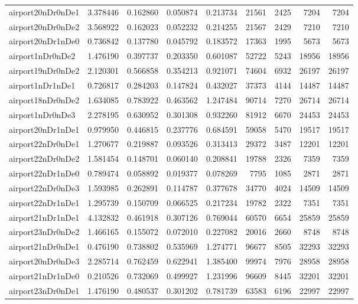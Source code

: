 \begin{longtable}{|l|r|r|r|r|r|r|r|r|}
airport20nDr0nDe1 & 3.378446 & 0.162860 & 0.050874 & 0.213734 & 21561 & 2425 & 7204 & 7204 \\
airport20nDr0nDe2 & 3.568922 & 0.162023 & 0.052232 & 0.214255 & 21567 & 2429 & 7210 & 7210 \\
airport20nDr1nDe0 & 0.736842 & 0.137780 & 0.045792 & 0.183572 & 17363 & 1995 & 5673 & 5673 \\
airport1nDr0nDe2 & 1.476190 & 0.397737 & 0.203350 & 0.601087 & 52722 & 5243 & 18956 & 18956 \\
airport19nDr0nDe2 & 2.120301 & 0.566858 & 0.354213 & 0.921071 & 74604 & 6932 & 26197 & 26197 \\
airport1nDr1nDe1 & 0.726817 & 0.284203 & 0.147824 & 0.432027 & 37373 & 4144 & 14487 & 14487 \\
airport18nDr0nDe2 & 1.634085 & 0.783922 & 0.463562 & 1.247484 & 90714 & 7270 & 26714 & 26714 \\
airport1nDr0nDe3 & 2.278195 & 0.630952 & 0.301308 & 0.932260 & 81912 & 6670 & 24453 & 24453 \\
airport20nDr1nDe1 & 0.979950 & 0.446815 & 0.237776 & 0.684591 & 59058 & 5470 & 19517 & 19517 \\
airport22nDr0nDe1 & 1.270677 & 0.219887 & 0.093526 & 0.313413 & 29372 & 3487 & 12201 & 12201 \\
airport22nDr0nDe2 & 1.581454 & 0.148701 & 0.060140 & 0.208841 & 19788 & 2326 & 7359 & 7359 \\
airport22nDr1nDe0 & 0.789474 & 0.058892 & 0.019377 & 0.078269 & 7795 & 1085 & 2871 & 2871 \\
airport22nDr0nDe3 & 1.593985 & 0.262891 & 0.114787 & 0.377678 & 34770 & 4024 & 14509 & 14509 \\
airport22nDr1nDe1 & 1.295739 & 0.150709 & 0.066525 & 0.217234 & 19782 & 2322 & 7351 & 7351 \\
airport21nDr1nDe1 & 4.132832 & 0.461918 & 0.307126 & 0.769044 & 60570 & 6654 & 25859 & 25859 \\
airport23nDr0nDe2 & 1.466165 & 0.155072 & 0.072010 & 0.227082 & 20016 & 2660 & 8748 & 8748 \\
airport21nDr0nDe1 & 0.476190 & 0.738802 & 0.535969 & 1.274771 & 96677 & 8505 & 32293 & 32293 \\
airport20nDr0nDe3 & 2.285714 & 0.762459 & 0.622941 & 1.385400 & 99974 & 7976 & 28958 & 28958 \\
airport21nDr1nDe0 & 0.210526 & 0.732069 & 0.499927 & 1.231996 & 96609 & 8445 & 32201 & 32201 \\
airport23nDr0nDe1 & 1.476190 & 0.480537 & 0.301202 & 0.781739 & 63583 & 6196 & 22997 & 22997 \\

\end{longtable}
